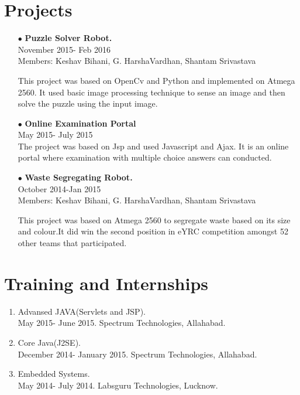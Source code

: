 \documentclass[12pt]{article}
\begin{document}
\section*{Projects}
\begin{itemize}
\item[$\bullet$]\textbf{Puzzle Solver Robot.}\\November 2015- Feb 2016\\Members: Keshav Bihani, G. HarshaVardhan, Shantam Srivastava

This project was based on OpenCv and Python and implemented on Atmega 2560. It used basic image processing technique to sense an image and then solve the puzzle using the input image.
\item[$\bullet$]\textbf{Online Examination Portal}\\May 2015- July 2015\\
The project was based on Jsp and used Javascript and Ajax. It is an online portal where examination with multiple choice answers can conducted.  
\item[$\bullet$]\textbf{Waste Segregating Robot.}\\October 2014-Jan 2015 \\Members: Keshav Bihani, G. HarshaVardhan, Shantam Srivastava

This project was based on Atmega 2560 to segregate waste based on its size and colour.It did win the second position in eYRC competition amongst 52 other teams that participated.
\end{itemize}
\section*{Training and Internships}
\begin{enumerate}
\item Advansed JAVA(Servlets and JSP).\\ May 2015- June 2015. Spectrum Technologies, Allahabad.
\item Core Java(J2SE).\\ December 2014- January 2015. Spectrum Technologies, Allahabad.
\item Embedded Systems.\\May 2014- July 2014. Labsguru Technologies, Lucknow.
\end{enumerate}
\end{document}
